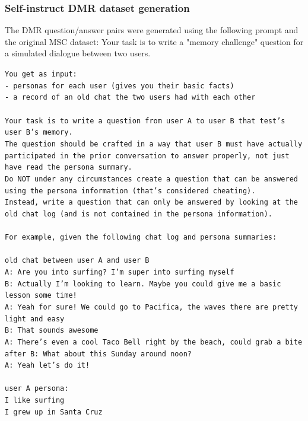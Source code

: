 \subsubsection{Self-instruct DMR dataset generation}
The DMR question/answer pairs were generated using the following prompt and the original MSC dataset:
Your task is to write a "memory challenge" question for a simulated dialogue between two users.
\begin{mdframed}
\small
\texttt{You get as input:\\
- personas for each user (gives you their basic facts)\\
- a record of an old chat the two users had with each other\\\\
Your task is to write a question from user A to user B that test's user B's memory.\\
The question should be crafted in a way that user B must have actually participated in the prior conversation to answer properly, not just have read the persona summary.\\
Do NOT under any circumstances create a question that can be answered using the persona information (that's considered cheating).\\
Instead, write a question that can only be answered by looking at the old chat log (and is not contained in the persona information).\\\\
For example, given the following chat log and persona summaries:\\\\
old chat between user A and user B\\
A: Are you into surfing? I'm super into surfing myself\\
B: Actually I'm looking to learn. Maybe you could give me a basic lesson some time!\\
A: Yeah for sure! We could go to Pacifica, the waves there are pretty light and easy\\
B: That sounds awesome\\
A: There's even a cool Taco Bell right by the beach, could grab a bite after
B: What about this Sunday around noon?\\
A: Yeah let's do it!\\\\
user A persona:\\
I like surfing\\
I grew up in Santa Cruz\\\\
}
\end{mdframed}
